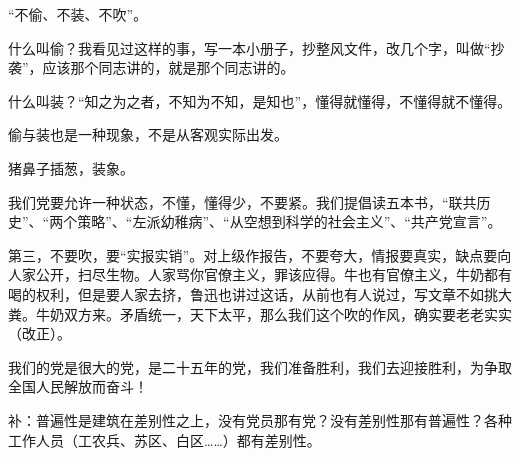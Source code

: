 “不偷、不装、不吹”。

什么叫偷？我看见过这样的事，写一本小册子，抄整风文件，改几个字，叫做“抄袭”，应该那个同志讲的，就是那个同志讲的。


什么叫装？“知之为之者，不知为不知，是知也”，懂得就懂得，不懂得就不懂得。

偷与装也是一种现象，不是从客观实际出发。

猪鼻子插葱，装象。

我们党要允许一种状态，不懂，懂得少，不要紧。我们提倡读五本书，“联共历史”、“两个策略”、“左派幼稚病”、“从空想到科学的社会主义”、“共产党宣言”。

第三，不要吹，要“实报实销”。对上级作报告，不要夸大，情报要真实，缺点要向人家公开，扫尽生物。人家骂你官僚主义，罪该应得。牛也有官僚主义，牛奶都有喝的权利，但是要人家去挤，鲁迅也讲过这话，从前也有人说过，写文章不如挑大粪。牛奶双方来。矛盾统一，天下太平，那么我们这个吹的作风，确实要老老实实（改正）。

我们的党是很大的党，是二十五年的党，我们准备胜利，我们去迎接胜利，为争取全国人民解放而奋斗！

补：普遍性是建筑在差别性之上，没有党员那有党？没有差别性那有普遍性？各种工作人员（工农兵、苏区、白区……）都有差别性。

